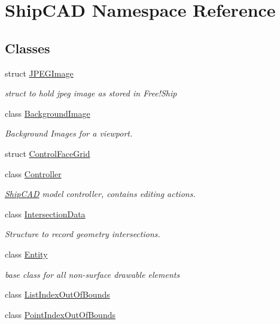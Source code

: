 \hypertarget{namespaceShipCAD}{\section{Ship\-C\-A\-D Namespace Reference}
\label{namespaceShipCAD}
}
\subsection*{Classes}
\begin{DoxyCompactItemize}
\item 
struct \hyperlink{structShipCAD_1_1JPEGImage}{J\-P\-E\-G\-Image}
\begin{DoxyCompactList}\small\item\em struct to hold jpeg image as stored in Free!\-Ship \end{DoxyCompactList}\item 
class \hyperlink{classShipCAD_1_1BackgroundImage}{Background\-Image}
\begin{DoxyCompactList}\small\item\em Background Images for a viewport. \end{DoxyCompactList}\item 
struct \hyperlink{structShipCAD_1_1ControlFaceGrid}{Control\-Face\-Grid}
\item 
class \hyperlink{classShipCAD_1_1Controller}{Controller}
\begin{DoxyCompactList}\small\item\em \hyperlink{namespaceShipCAD}{Ship\-C\-A\-D} model controller, contains editing actions. \end{DoxyCompactList}\item 
class \hyperlink{classShipCAD_1_1IntersectionData}{Intersection\-Data}
\begin{DoxyCompactList}\small\item\em Structure to record geometry intersections. \end{DoxyCompactList}\item 
class \hyperlink{classShipCAD_1_1Entity}{Entity}
\begin{DoxyCompactList}\small\item\em base class for all non-\/surface drawable elements \end{DoxyCompactList}\item 
class \hyperlink{classShipCAD_1_1ListIndexOutOfBounds}{List\-Index\-Out\-Of\-Bounds}
\item 
class \hyperlink{classShipCAD_1_1PointIndexOutOfBounds}{Point\-Index\-Out\-Of\-Bounds}

\end{DoxyCompactItemize}
